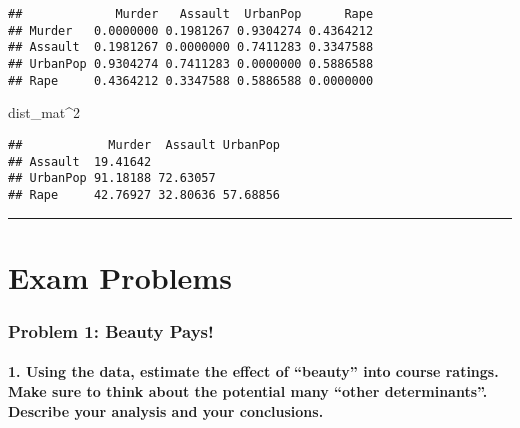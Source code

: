 \documentclass[
]{article}
\newenvironment{Shaded}{\begin{snugshade}}{\end{snugshade}}
\newcommand{\DecValTok}[1]{\textcolor[rgb]{0.00,0.00,0.81}{#1}}
\newcommand{\NormalTok}[1]{#1}
\newcommand{\SpecialCharTok}[1]{\textcolor[rgb]{0.00,0.00,0.00}{#1}}
\begin{document}
\begin{verbatim}
##             Murder   Assault  UrbanPop      Rape
## Murder   0.0000000 0.1981267 0.9304274 0.4364212
## Assault  0.1981267 0.0000000 0.7411283 0.3347588
## UrbanPop 0.9304274 0.7411283 0.0000000 0.5886588
## Rape     0.4364212 0.3347588 0.5886588 0.0000000
\end{verbatim}

\begin{Shaded}
\begin{Highlighting}[]
\NormalTok{dist\_mat}\SpecialCharTok{\^{}}\DecValTok{2}
\end{Highlighting}
\end{Shaded}

\begin{verbatim}
##            Murder  Assault UrbanPop
## Assault  19.41642                  
## UrbanPop 91.18188 72.63057         
## Rape     42.76927 32.80636 57.68856
\end{verbatim}

\begin{center}\rule{0.5\linewidth}{0.5pt}\end{center}

\hypertarget{exam-problems}{%
\section{Exam Problems}\label{exam-problems}}

\hypertarget{problem-1-beauty-pays}{%
\subsubsection{Problem 1: Beauty Pays!}\label{problem-1-beauty-pays}}

\hypertarget{using-the-data-estimate-the-effect-of-beauty-into-course-ratings.-make-sure-to-think-about-the-potential-many-other-determinants.-describe-your-analysis-and-your-conclusions.}{%
\paragraph{1. Using the data, estimate the effect of ``beauty'' into
course ratings. Make sure to think about the potential many ``other
determinants''. Describe your analysis and your
conclusions.}\label{using-the-data-estimate-the-effect-of-beauty-into-course-ratings.-make-sure-to-think-about-the-potential-many-other-determinants.-describe-your-analysis-and-your-conclusions.}}
\end{document}
